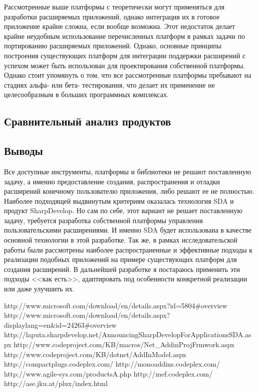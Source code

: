 Рассмотренные выше платформы с теоретически могут применяться для разработки расширяемых приложений, однако интеграция их в готовое приложение крайне сложна, если вообще возможна. Этот недостаток делает крайне неудобным использование перечисленных платформ в рамках задачи по портированию расширяемых приложений. Однако, основные принципы построения существующих платформ для интеграции поддержки расширений с успехом может быть использован для проектирования собственной платформы. Однако стоит упомянуть о том, что все рассмотренные платформы пребывают на стадиях альфа- или бета- тестирования, что делает их применение не целесообразным в больших программных комплексах.

\subsection{Сравнительный анализ продуктов}




\subsection{Выводы}

Все доступные инструменты, платформы и библиотеки не решают поставленную задачу, а именно предоставление создания, распространения и отладки расширений конечному пользователю приложения, либо решают ее не полностью. Наиболее подходящей выдвинутым критериям оказалась технология SDA и продукт SharpDevelop.  Но сам по себе, этот вариант не решает поставленную задачу, требуется разработка собственной платформы управления пользовательскими расширениями. И именно SDA будет использована в качестве основной технологии в этой разработке. Так же, в рамках исследовательской работы были рассмотрены наиболее распространенные и эффективные подходы к реализации подобных приложений на примере существующих платформ для создания расширений. В дальнейшей разработке я постараюсь применить эти подходы <<как есть>>, адаптировать под особенности конкретной реализации или даже улучшить их.

http://www.microsoft.com/download/en/details.aspx?id=5804\#overview
http://www.microsoft.com/download/en/details.aspx?displaylang=en\&id=24263\#overview
http://laputa.sharpdevelop.net/AnnouncingSharpDevelopForApplicationsSDA.aspx
http://www.codeproject.com/KB/macros/Net\_AddinProjFrmwork.aspx
http://www.codeproject.com/KB/dotnet/AddInModel.aspx
http://compactplugs.codeplex.com/
http://monoaddins.codeplex.com/
http://www.agile-sys.com/productsA.php
http://mef.codeplex.com/
http://ase.jku.at/plux/index.html

\pagebreak
